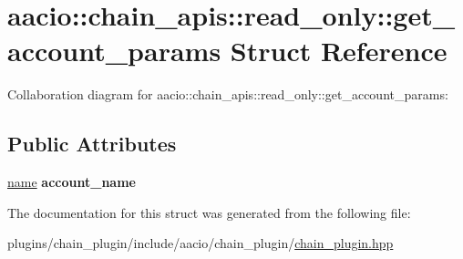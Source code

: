 \hypertarget{structaacio_1_1chain__apis_1_1read__only_1_1get__account__params}{}\section{aacio\+:\+:chain\+\_\+apis\+:\+:read\+\_\+only\+:\+:get\+\_\+account\+\_\+params Struct Reference}
\label{structaacio_1_1chain__apis_1_1read__only_1_1get__account__params}


Collaboration diagram for aacio\+:\+:chain\+\_\+apis\+:\+:read\+\_\+only\+:\+:get\+\_\+account\+\_\+params\+:
\subsection*{Public Attributes}
\begin{DoxyCompactItemize}
\item 
\mbox{\label{structaacio_1_1chain__apis_1_1read__only_1_1get__account__params_a3f5da75ec22a113031e3d74fe136ed46}} 
\mbox{\hyperlink{structaacio_1_1name}{name}} {\bfseries account\+\_\+name}
\end{DoxyCompactItemize}


The documentation for this struct was generated from the following file\+:\begin{DoxyCompactItemize}
\item 
plugins/chain\+\_\+plugin/include/aacio/chain\+\_\+plugin/\mbox{\hyperlink{chain__plugin_8hpp}{chain\+\_\+plugin.\+hpp}}\end{DoxyCompactItemize}
